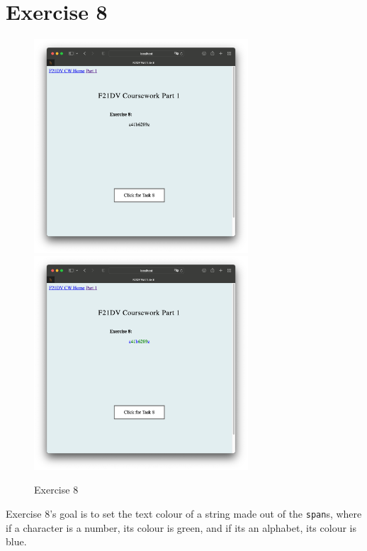 \documentclass{scrreprt}
\begin{document}
\section{Exercise 8}
\begin{figure}[!ht]
    \centering
    \includegraphics[width = 8cm]{images/ex8_1.png}
    \includegraphics[width = 8cm]{images/ex8_2.png}
    \label{fig:ex8}
    \caption{Exercise 8}
\end{figure}
\FloatBarrier
% 
Exercise 8's goal is to set the text colour of a string made out of the \verb|span|s, where if a
character is a number, its colour is green, and if its an alphabet, its colour is blue.

\newpage
\end{document}
